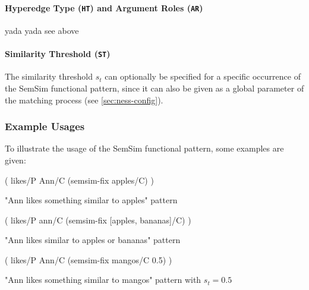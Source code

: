 \documentclass[11pt]{scrreprt}
\begin{document}
\paragraph{Hyperedge Type (\texttt{HT}) and Argument Roles (\texttt{AR})}
yada yada see above 


\paragraph{Similarity Threshold (\texttt{ST})}
The similarity threshold \(s_t\) can optionally be specified for a specific occurrence of the SemSim functional pattern, since it can also be given as a global parameter of the matching process (see \cref{sec:ness-config}). 

\subsubsection{Example Usages}

To illustrate the usage of the SemSim functional pattern, some examples are given:

\begin{pattern}[h!]
  \normalfont\sffamily
  \centering
  ( likes/P Ann/C (semsim-fix apples/C) )
  \caption{"Ann likes something similar to apples" pattern}
  \label{pat:ann-likes-semsim-aplles}
\end{pattern}

\begin{pattern}[h!]
  \normalfont\sffamily
  \centering
  ( likes/P ann/C (semsim-fix [apples, bananas]/C) )
  \caption{"Ann likes similar to apples or bananas" pattern}
  \label{pat:ann-likes-apples-and-bananas}
\end{pattern}


\begin{pattern}[h!]
  \normalfont\sffamily
  \centering
  ( likes/P Ann/C (semsim-fix mangos/C 0.5) )
  \caption{"Ann likes something similar to mangos" pattern with \(s_t = 0.5\)}
  \label{pat:ann-likes-semsim-aplles}
\end{pattern}
\end{document}
